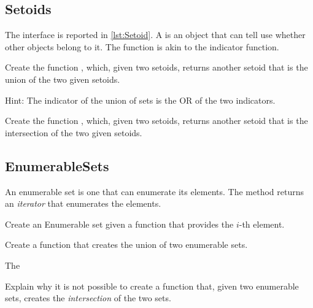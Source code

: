 \subsection{Setoids}

The \Setoid interface is reported in \cref{lst:Setoid}.
%
A \Setoid is an object that can tell use whether other objects belong to it.
The  function is akin to the indicator function.

\begin{codeexercise}
    Create the function , which, given two setoids, returns another setoid that is the union of the two given setoids.

    Hint: The indicator of the union of sets is the OR of the two indicators.
\end{codeexercise}

\begin{codeexercise}
    Create the function , which, given two setoids, returns another setoid that is the intersection of the two given setoids.
\end{codeexercise}


\subsection{EnumerableSets}

%
An enumerable set is one that can enumerate its elements.
The method  returns an \emph{iterator} that enumerates the elements.

\begin{codeexercise}
    Create an Enumerable set given a function that provides the $i$-th element.

\end{codeexercise}

\begin{codeexercise}
    Create a function that creates the union of two enumerable sets.

    The
\end{codeexercise}

\begin{codeexercise}
    Explain why it is not possible to create a function that, given two enumerable sets, creates the \emph{intersection} of the two sets.
\end{codeexercise}
